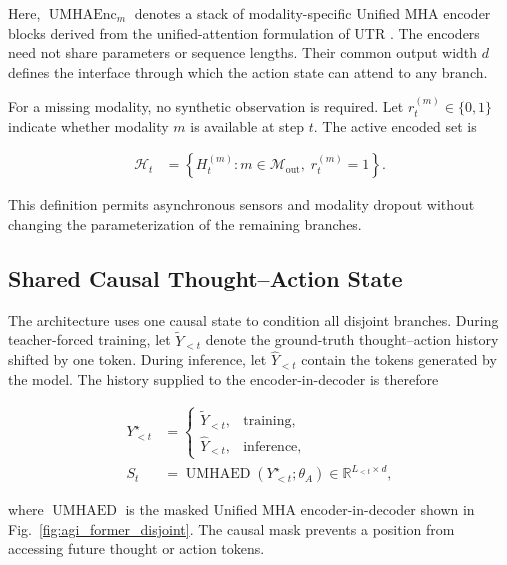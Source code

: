 Here, $\operatorname{UMHAEnc}_{m}$ denotes a stack of modality-specific Unified MHA encoder blocks derived from the unified-attention formulation of UTR \cite{zohourian2026utr}. The encoders need not share parameters or sequence lengths. Their common output width $d$ defines the interface through which the action state can attend to any branch.

For a missing modality, no synthetic observation is required. Let $r_t^{(m)}\in\{0,1\}$ indicate whether modality $m$ is available at step $t$. The active encoded set is

\begin{equation}
\begin{aligned}
    \mathcal{H}_t
    &= \left\{
       H_t^{(m)}:
       m\in\mathcal{M}_{\mathrm{out}},\;
       r_t^{(m)}=1
       \right\}.
\end{aligned}
\label{eq:active_modalities}
\end{equation}

This definition permits asynchronous sensors and modality dropout without changing the parameterization of the remaining branches.

\subsection{\textbf{Shared Causal Thought--Action State}}

The architecture uses one causal state to condition all disjoint branches. During teacher-forced training, let $\widetilde{Y}_{<t}$ denote the ground-truth thought--action history shifted by one token. During inference, let $\widehat{Y}_{<t}$ contain the tokens generated by the model. The history supplied to the encoder-in-decoder is therefore

\begin{equation}
\begin{aligned}
    Y^{\star}_{<t}
    &=
    \begin{cases}
        \widetilde{Y}_{<t}, & \text{training},\\
        \widehat{Y}_{<t},   & \text{inference},
    \end{cases}\\
    S_t
    &= \operatorname{UMHAED}\!\left(
       Y^{\star}_{<t};\theta_{A}
       \right)
     \in\mathbb{R}^{L_{<t}\times d},
\end{aligned}
\label{eq:disjoint_action_state}
\end{equation}

where $\operatorname{UMHAED}$ is the masked Unified MHA encoder-in-decoder shown in Fig.~\ref{fig:agi_former_disjoint}. The causal mask prevents a position from accessing future thought or action tokens.

